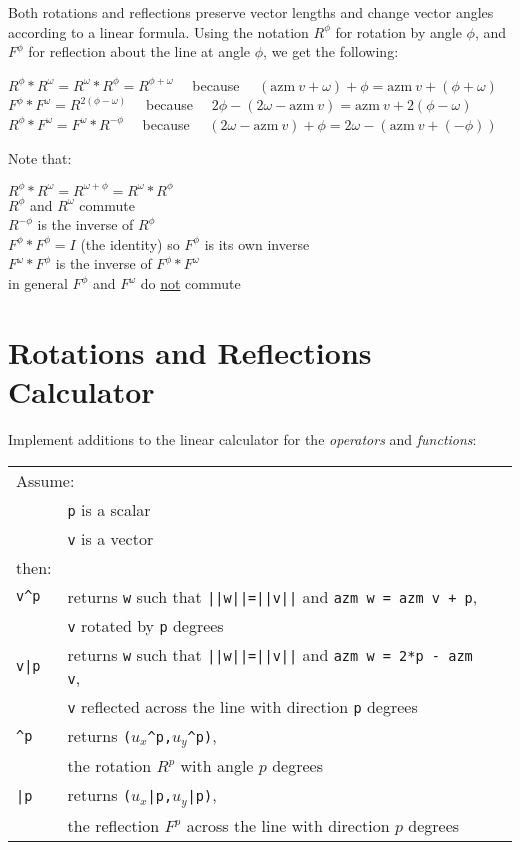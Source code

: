 \documentclass[12pt]{article}
\begin{document}
Both rotations and reflections preserve vector lengths
and change vector angles according to a linear formula.
Using the notation $R^\phi$ for rotation by angle $\phi$,
and $F^\phi$ for reflection about the line at angle $\phi$,
we get the following:
\begin{center}
$R^\phi*R^\omega=R^\omega*R^\phi=R^{\phi+\omega}$
~~because~~
    $(\mathrm{azm}~v + \omega) + \phi = \mathrm{azm}~v + (\phi+\omega)$ \\
$F^\phi*F^\omega = R^{2(\phi-\omega)}$
~~because~~
    $2\phi - (2\omega - \mathrm{azm}~v) = \mathrm{azm}~v + 2(\phi-\omega)$ \\
$R^\phi*F^\omega = F^\omega*R^{-\phi}$
~~because~~
    $(2\omega - \mathrm{azm}~v) + \phi =
      2\omega - (\mathrm{azm}~v + (-\phi))$
\end{center}
Note that:
\begin{center}
$R^\phi*R^\omega=R^{\omega+\phi}=R^\omega*R^\phi$ \\
$R^\phi$ and $R^\omega$ commute \\
$R^{-\phi}$ is the inverse of $R^\phi$ \\
$F^\phi*F^\phi= I$ (the identity) so  $F^\phi$ is its own inverse \\
$F^\omega*F^\phi$ is the inverse of $F^\phi*F^\omega$ \\
in general $F^\phi$ and $F^\omega$ do \underline{not} commute\\
\end{center}

\bigskip

\section{Rotations and Reflections Calculator}
Implement additions to the linear calculator for
the {\em operators} and {\em functions}:
\begin{center}
\begin{tabular}{l@{~~~~~}l@{~~~~~}l}
\multicolumn{2}{l}{Assume:} \\
        & {\tt p} is a scalar \\
	& {\tt v} is a vector \\
then: \\[1ex]
\tt v\textasciicircum p & returns {\tt w} such that {\tt ||w||=||v||} and
	                  {\tt azm w = azm v + p}, \\
			& {\tt v} rotated by {\tt p} degrees \\
\tt v|p & returns {\tt w} such that {\tt ||w||=||v||} and
	                  {\tt azm w = 2*p\,-\,azm v}, \\
			& {\tt v} reflected across the line with direction
			  {\tt p} degrees \\
\tt \textasciicircum p
       & returns {\tt ($u_x$\textasciicircum p,$u_y$\textasciicircum p)}, \\
       & the rotation $R^p$ with angle $p$ degrees \\
\tt |p & returns {\tt ($u_x$|p,$u_y$|p)}, \\
       & the reflection $F^p$ across the line with direction $p$ degrees \\
\end{tabular}
\end{center}
\end{document}
